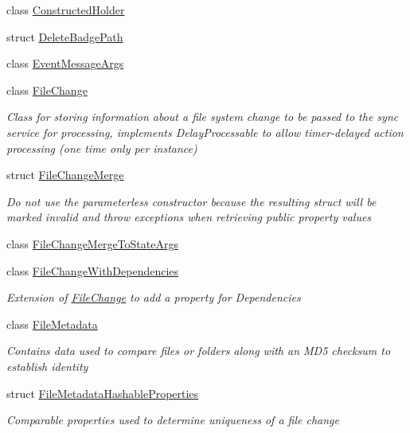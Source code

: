 \begin{DoxyCompactItemize}
class \hyperlink{class_cloud_api_public_1_1_model_1_1_constructed_holder}{Constructed\-Holder}
\item 
struct \hyperlink{struct_cloud_api_public_1_1_model_1_1_delete_badge_path}{Delete\-Badge\-Path}
\item 
class \hyperlink{class_cloud_api_public_1_1_model_1_1_event_message_args}{Event\-Message\-Args}
\item 
class \hyperlink{class_cloud_api_public_1_1_model_1_1_file_change}{File\-Change}
\begin{DoxyCompactList}\small\item\em Class for storing information about a file system change to be passed to the sync service for processing, implements Delay\-Processable to allow timer-\/delayed action processing (one time only per instance) \end{DoxyCompactList}\item 
struct \hyperlink{struct_cloud_api_public_1_1_model_1_1_file_change_merge}{File\-Change\-Merge}
\begin{DoxyCompactList}\small\item\em Do not use the parameterless constructor because the resulting struct will be marked invalid and throw exceptions when retrieving public property values \end{DoxyCompactList}\item 
class \hyperlink{class_cloud_api_public_1_1_model_1_1_file_change_merge_to_state_args}{File\-Change\-Merge\-To\-State\-Args}
\item 
class \hyperlink{class_cloud_api_public_1_1_model_1_1_file_change_with_dependencies}{File\-Change\-With\-Dependencies}
\begin{DoxyCompactList}\small\item\em Extension of \hyperlink{class_cloud_api_public_1_1_model_1_1_file_change}{File\-Change} to add a property for Dependencies \end{DoxyCompactList}\item 
class \hyperlink{class_cloud_api_public_1_1_model_1_1_file_metadata}{File\-Metadata}
\begin{DoxyCompactList}\small\item\em Contains data used to compare files or folders along with an M\-D5 checksum to establish identity \end{DoxyCompactList}\item 
struct \hyperlink{struct_cloud_api_public_1_1_model_1_1_file_metadata_hashable_properties}{File\-Metadata\-Hashable\-Properties}
\begin{DoxyCompactList}\small\item\em Comparable properties used to determine uniqueness of a file change \end{DoxyCompactList}\item 

\end{DoxyCompactItemize}
